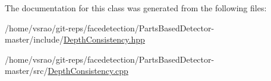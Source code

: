 The documentation for this class was generated from the following files\-:\begin{DoxyCompactItemize}
\item 
/home/vsrao/git-\/reps/facedetection/\-Parts\-Based\-Detector-\/master/include/\hyperlink{DepthConsistency_8hpp}{Depth\-Consistency.\-hpp}\item 
/home/vsrao/git-\/reps/facedetection/\-Parts\-Based\-Detector-\/master/src/\hyperlink{DepthConsistency_8cpp}{Depth\-Consistency.\-cpp}\end{DoxyCompactItemize}
